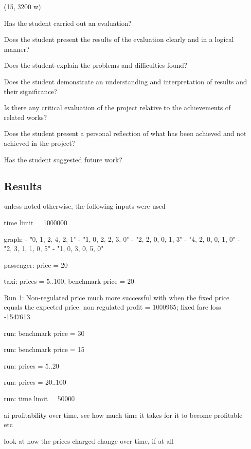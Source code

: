 (15, 3200 w)

Has the student carried out an evaluation?

Does the student present the results of the evaluation clearly and in a logical
manner?

Does the student explain the problems and difficulties found?

Does the student demonstrate an understanding and interpretation of results and
their significance?

Is there any critical evaluation of the project relative to the achievements of
related works?

Does the student present a personal reflection of what has been achieved and
not achieved in the project?

Has the student suggested future work?


\subsection{Results}
unless noted otherwise, the following inputs were used
 
time limit = 1000000

graph:
  - "0, 1, 2, 4, 2, 1"
  - "1, 0, 2, 2, 3, 0"
  - "2, 2, 0, 0, 1, 3"
  - "4, 2, 0, 0, 1, 0"
  - "2, 3, 1, 1, 0, 5"
  - "1, 0, 3, 0, 5, 0"

passenger: price = 20

taxi: prices = 5..100, benchmark price = 20

Run 1: Non-regulated price much more successful with when the fixed price
equals the expected price. non regulated profit = 1000965; fixed fare loss
-1547613


run: benchmark price = 30

run: benchmark price = 15

run: prices = 5..20

run: prices = 20..100

run: time limit = 50000


ai profitability over time, see how much time it takes for it to become
profitable etc

look at how the prices charged change over time, if at all
